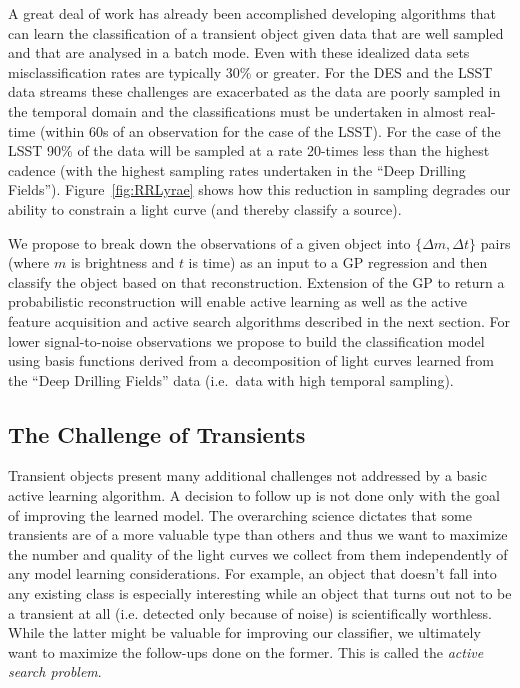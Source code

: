 \documentclass[prd,nofootbib,floatfix,11pt,tightenlines,nofootinbib]{revtex4}
\begin{document}
A great deal of work has already been accomplished developing algorithms
that can learn the classification of a transient object given data that are
well sampled and that are analysed in a batch mode. Even with these
idealized data sets misclassification rates are typically 30\% or greater.
For the DES and the LSST data streams these challenges are exacerbated as
the data are poorly sampled in the temporal domain and the classifications
must be undertaken in almost real-time (within 60s of an observation for
the case of the LSST).  For the case of the LSST 90\% of the data will be
sampled at a rate 20-times less than the highest cadence (with the highest
sampling rates undertaken in the ``Deep Drilling Fields'').
Figure~\ref{fig:RRLyrae} shows how this reduction in sampling degrades our
ability to constrain a light curve (and thereby classify a source).

We propose to break down the observations of a given object into $\{\Delta
m,\Delta t\}$ pairs (where $m$ is brightness and $t$ is time) as an input
to a GP regression and then classify the object based on that
reconstruction. Extension of the GP to return a probabilistic
reconstruction will enable active learning as well as the active feature
acquisition and active search algorithms described in the next section. For
lower signal-to-noise observations we propose to build the classification
model using basis functions derived from a decomposition of light curves
learned from the ``Deep Drilling Fields'' data (i.e.\ data with high
temporal sampling).

\subsection{The Challenge of Transients}

Transient objects present many additional challenges not addressed by a
basic active learning algorithm.  A decision to follow up is not done only
with the goal of improving the learned model.  The overarching science
dictates that some transients are of a more valuable type than others and
thus we want to maximize the number and quality of the light curves we
collect from them independently of any model learning considerations.  For
example, an object that doesn't fall into any existing class is especially
interesting while an object that turns out not to be a transient at all
(i.e. detected only because of noise) is scientifically worthless.  While
the latter might be valuable for improving our classifier, we ultimately
want to maximize the follow-ups done on the former.  This is called the
{\em active search problem}.
\end{document}
